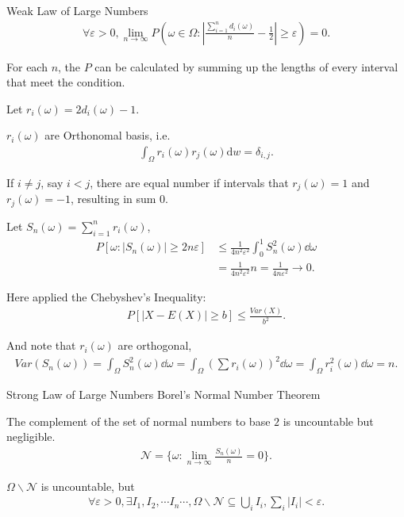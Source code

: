 \begin{thm}{Weak Law of Large Numbers}{}
    \begin{align*}
        \forall  \varepsilon >0, \lim_{n\to \infty}P(\omega \in \Omega : |\frac{\sum_{i=1}^n d_i(\omega)}{n} - \frac{1}{2}| \ge \varepsilon ) = 0
    .\end{align*}
\end{thm}

For each $n$, the $P$ can be calculated by summing up the lengths of every interval that meet the condition.

Let $r_i(\omega ) = 2d_i(\omega ) - 1$.
\begin{qte}
    $r_i(\omega )$ are Orthonomal basis, i.e.
    \begin{align*}
        \int_\Omega r_i(\omega )r_j(\omega ) \mathrm{d} w = \delta_{i,j}
    .\end{align*}

    If $i \neq j$, say $i < j$, there are equal number if intervals that $r_j(\omega ) = 1$ and $r_j(\omega ) = -1$, resulting in sum $0$.
\end{qte}

Let $S_n(\omega ) = \sum_{i=1}^n r_i(\omega )$,
\begin{align*}
    P[\omega : |S_n(\omega )| \ge 2n\varepsilon ] &\le \frac{1}{4n^2\varepsilon ^2} \int_0^1 S_n^2(\omega )\dd\omega \\
    &= \frac{1}{4n^2\varepsilon ^2}n = \frac{1}{4n\varepsilon ^2} \to  0
.\end{align*}

\begin{qte}
    Here applied the Chebyshev's Inequality:
    \begin{align*}
        P[|X - E(X)| \ge b] \le \frac{Var(X)}{b^2}
    .\end{align*}

    And note that $r_i(\omega )$ are orthogonal,
    \begin{align*}
        Var(S_n(\omega )) = \int_\Omega S_n^2(\omega )\dd\omega = \int_\Omega (\sum r_i(\omega ))^2 \dd\omega = \int_\Omega r_i^2(\omega )\dd\omega  = n
    .\end{align*}
\end{qte}

\begin{thm}{Strong Law of Large Numbers}{}
    Borel's Normal Number Theorem

    The complement of the set of normal numbers to base $2$ is uncountable but negligible.
    \begin{align*}
        \mathcal{N} = \{\omega : \lim_{n\to \infty} \frac{S_n(\omega )}{n} = 0\}
    .\end{align*}

    $\Omega \backslash \mathcal{N}$ is uncountable, but
    \begin{align*}
        \forall \varepsilon > 0, \exists I_1, I_2, \cdots I_n \cdots , \Omega \backslash \mathcal{N} \subseteq \bigcup_i I_i, \sum_i |I_i| < \varepsilon 
    .\end{align*}
\end{thm}

